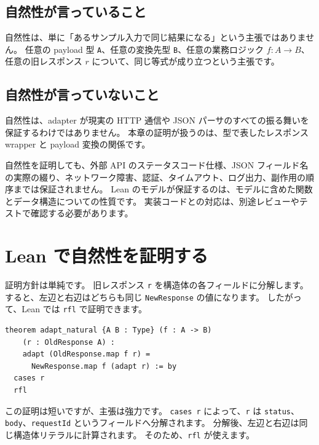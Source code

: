 
\subsection{自然性が言っていること}

自然性は、単に「あるサンプル入力で同じ結果になる」という主張ではありません。
任意の payload 型 \texttt{A}、任意の変換先型 \texttt{B}、任意の業務ロジック \(f : A \to B\)、任意の旧レスポンス \(r\) について、同じ等式が成り立つという主張です。

\subsection{自然性が言っていないこと}

自然性は、adapter が現実の HTTP 通信や JSON パーサのすべての振る舞いを保証するわけではありません。
本章の証明が扱うのは、型で表したレスポンス wrapper と payload 変換の関係です。

自然性を証明しても、外部 API のステータスコード仕様、JSON フィールド名の実際の綴り、ネットワーク障害、認証、タイムアウト、ログ出力、副作用の順序までは保証されません。
Lean のモデルが保証するのは、モデルに含めた関数とデータ構造についての性質です。
実装コードとの対応は、別途レビューやテストで確認する必要があります。

\section{Lean で自然性を証明する}

証明方針は単純です。
旧レスポンス \texttt{r} を構造体の各フィールドに分解します。
すると、左辺と右辺はどちらも同じ \texttt{NewResponse} の値になります。
したがって、Lean では \texttt{rfl} で証明できます。

\begin{listing}[htbp]
\begin{verbatim}
theorem adapt_natural {A B : Type} (f : A -> B)
    (r : OldResponse A) :
    adapt (OldResponse.map f r) =
      NewResponse.map f (adapt r) := by
  cases r
  rfl
\end{verbatim}
\caption{\texttt{adapt\_natural}}
\label{lst:ch31-adapt-natural}
\end{listing}

この証明は短いですが、主張は強力です。
\texttt{cases r} によって、\texttt{r} は \texttt{status}、\texttt{body}、\texttt{requestId} というフィールドへ分解されます。
分解後、左辺と右辺は同じ構造体リテラルに計算されます。
そのため、\texttt{rfl} が使えます。

